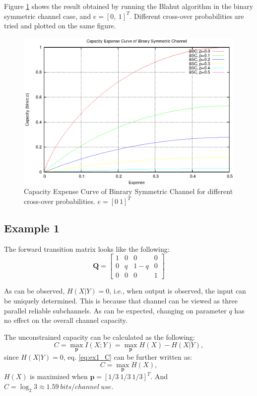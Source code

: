 \documentclass[a4paper,10pt]{article}
\begin{document}
Figure \ref{fig:bsc_cap} shows the result obtained by running the Blahut algorithm in the binary symmetric channel case, and $e=[0,\ 1]^T$. Different cross-over probabilities are tried and plotted on the same figure.
\begin{figure}
 \centering
 \includegraphics{pic/bsc_cap.eps}
 \caption{Capacity Expense Curve of Binrary Symmetric Channel for different cross-over probabilities. $e=[0\ 1]^T$}
 \label{fig:bsc_cap}
\end{figure}

\subsection{Example 1}
The forward transition matrix looks like the following:
\[
 \mathbf{Q} = \left[ 
\begin{array}{cccc}
1 & 0 & 0 & 0 \\ 
0 & q & 1-q & 0 \\ 
0 & 0 & 0 & 1
\end{array}\right] 
\]

As can be observed, $H(X|Y)=0$, i.e., when output is observed, the input can be uniquely determined. This is because that channel can be viewed as three parallel reliable subchannels. As can be expected, changing on parameter $q$ has no effect on the overall channel capacity.

The unconstrained capacity can be calculated as the following:
\begin{equation}
 C=\max_{\mathbf{p}} {I(X;Y)}=\max_{\mathbf{p}} {H(X)-H(X|Y)},
\label{eq:ex1_C}
\end{equation}
since $H(X|Y)=0$, eq. \ref{eq:ex1_C} can be further written as:
\begin{equation}
 C=\max_{\mathbf{p}}{H(X)},
\end{equation}
$H(X)$ is maximized when $\mathbf{p}=[1/3\ 1/3\ 1/3]^T$. And $C=\log_2{3}\approx1.59\ bits/channel\ use$.
\end{document}
